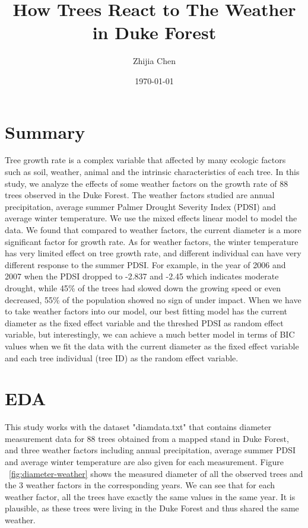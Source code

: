 \documentclass{article}
\title{How Trees React to The Weather in Duke Forest}
\author{Zhijia Chen}
\date{\today}
\begin{document}
\begin{titlepage}
    \maketitle
\end{titlepage}

\section*{Summary}
Tree growth rate is a complex variable that affected by many ecologic factors such as soil, weather, animal and the intrinsic characteristics of each tree. In this study, we analyze the effects of some weather factors on the growth rate of 88 trees observed in the Duke Forest. The weather factors studied are annual precipitation, average summer Palmer Drought Severity Index (PDSI) and average winter temperature. We use the mixed effects linear model \cite{lme} to model the data. We found that compared to weather factors, the current diameter is a more significant factor for growth rate. As for weather factors, the winter temperature has very limited effect on tree growth rate, and different individual can have very different response to the summer PDSI. For example, in the year of 2006 and 2007 when the PDSI dropped to -2.837 and -2.45 which indicates moderate drought, while 45\% of the trees had slowed down the growing speed or even decreased, 55\% of the population showed no sign of under impact. When we have to take weather factors into our model, our best fitting model has the current diameter as the fixed effect variable and the threshed PDSI as random effect variable, but interestingly, we can achieve a much better model in terms of BIC values when we fit the data with the current diameter as the fixed effect variable and each tree individual (tree ID) as the random effect variable.

\section*{EDA}

This study works with the dataset "diamdata.txt"\cite{data} that contains diameter measurement data for 88 trees obtained from a mapped stand in Duke Forest, and three weather factors including annual precipitation, average summer PDSI and average winter temperature are also given for each measurement. Figure ~\ref{fig:diameter-weather} shows the measured diameter of all the observed trees and the 3 weather factors in the corresponding years. We can see that for each weather factor, all the trees have exactly the same values in the same year. It is plausible, as these trees were living in the Duke Forest and thus shared the same weather. 
\end{document}
